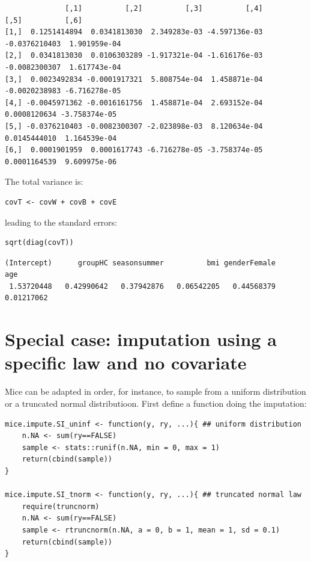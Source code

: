 \documentclass[12pt]{article}
\begin{document}
\begin{verbatim}
              [,1]          [,2]          [,3]          [,4]          [,5]          [,6]
[1,]  0.1251414894  0.0341813030  2.349283e-03 -4.597136e-03 -0.0376210403  1.901959e-04
[2,]  0.0341813030  0.0106303289 -1.917321e-04 -1.616176e-03 -0.0082300307  1.617743e-04
[3,]  0.0023492834 -0.0001917321  5.808754e-04  1.458871e-04 -0.0020238983 -6.716278e-05
[4,] -0.0045971362 -0.0016161756  1.458871e-04  2.693152e-04  0.0008120634 -3.758374e-05
[5,] -0.0376210403 -0.0082300307 -2.023898e-03  8.120634e-04  0.0145444010  1.164539e-04
[6,]  0.0001901959  0.0001617743 -6.716278e-05 -3.758374e-05  0.0001164539  9.609975e-06
\end{verbatim}

The total variance is:
\lstset{language=r,label= ,caption= ,captionpos=b,numbers=none}
\begin{lstlisting}
covT <- covW + covB + covE
\end{lstlisting}

leading to the standard errors:
\lstset{language=r,label= ,caption= ,captionpos=b,numbers=none}
\begin{lstlisting}
sqrt(diag(covT))
\end{lstlisting}
\begin{verbatim}
(Intercept)      groupHC seasonsummer          bmi genderFemale          age 
 1.53720448   0.42990642   0.37942876   0.06542205   0.44568379   0.01217062
\end{verbatim}

\clearpage

\section{Special case: imputation using a specific law and no covariate}
\label{sec:org6a231b5}
Mice can be adapted in order, for instance, to sample from a uniform
distribution or a truncated normal distributioon. First define a
function doing the imputation:
\lstset{language=r,label= ,caption= ,captionpos=b,numbers=none}
\begin{lstlisting}
mice.impute.SI_uninf <- function(y, ry, ...){ ## uniform distribution
	n.NA <- sum(ry==FALSE)
	sample <- stats::runif(n.NA, min = 0, max = 1)
	return(cbind(sample))
}

mice.impute.SI_tnorm <- function(y, ry, ...){ ## truncated normal law
	require(truncnorm)
	n.NA <- sum(ry==FALSE)
	sample <- rtruncnorm(n.NA, a = 0, b = 1, mean = 1, sd = 0.1)
	return(cbind(sample))
}
\end{lstlisting}
\end{document}
